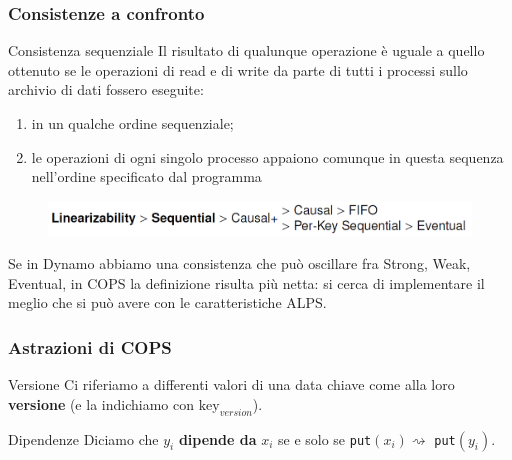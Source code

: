 \begin{frame}
\frametitle{Consistenze a confronto}
\begin{block}{Consistenza sequenziale}
Il risultato di qualunque operazione è uguale a quello ottenuto se le operazioni
di read e di write da parte di tutti i processi sullo archivio di dati fossero eseguite:
	\begin{enumerate}
		\item in un qualche ordine sequenziale;
		\item le operazioni di ogni singolo processo appaiono comunque in questa sequenza
			  nell'ordine specificato dal programma
	\end{enumerate}
\end{block}	
	\begin{figure}
		\centering
		\includegraphics[scale=0.35]{COPS/COPS6.png}
	\end{figure}

Se in Dynamo abbiamo una consistenza che può oscillare fra Strong, Weak, Eventual,
in COPS la definizione risulta più netta: si cerca di implementare il meglio che si può
avere con le caratteristiche ALPS.
\end{frame}

\begin{frame}
\frametitle{Astrazioni di COPS}
\begin{block}{Versione}
Ci riferiamo a differenti valori di una data chiave come alla loro \textbf{versione}
(e la indichiamo con $\text{key}_{version}$).
\end{block}
\begin{block}{Dipendenze}
Diciamo che $y_i$ \textbf{dipende da} $x_i$ se e solo se \texttt{put}$(x_i)
\rightsquigarrow$ \texttt{put}$(y_i)$.
\end{block}
\end{frame}

